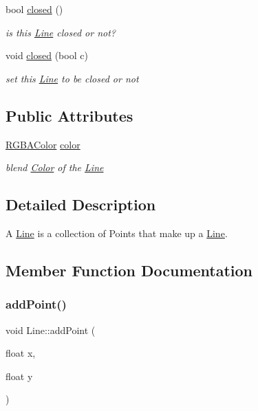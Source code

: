 \begin{DoxyCompactItemize}
bool \hyperlink{class_line_ae8d925ead08fe61d66621bfc0299482d}{closed} ()
\begin{DoxyCompactList}\small\item\em is this \hyperlink{class_line}{Line} closed or not? \end{DoxyCompactList}\item 
void \hyperlink{class_line_ac5c50dee9dd6f623a3c8ee523d504ecc}{closed} (bool c)
\begin{DoxyCompactList}\small\item\em set this \hyperlink{class_line}{Line} to be closed or not \end{DoxyCompactList}\end{DoxyCompactItemize}
\subsection*{Public Attributes}
\begin{DoxyCompactItemize}
\item 
\mbox{\label{class_line_a4d5c05eecb05f68ebf52c6b553262496}} 
\hyperlink{struct_r_g_b_a_color}{R\+G\+B\+A\+Color} \hyperlink{class_line_a4d5c05eecb05f68ebf52c6b553262496}{color}
\begin{DoxyCompactList}\small\item\em blend \hyperlink{struct_color}{Color} of the \hyperlink{class_line}{Line} \end{DoxyCompactList}\end{DoxyCompactItemize}


\subsection{Detailed Description}
A \hyperlink{class_line}{Line} is a collection of Points that make up a \hyperlink{class_line}{Line}. 

\subsection{Member Function Documentation}
\mbox{\label{class_line_ac4b0054084c2ed06583fce888921aaae}} 
\subsubsection{\texorpdfstring{add\+Point()}{addPoint()}}
{\footnotesize\ttfamily void Line\+::add\+Point (\begin{DoxyParamCaption}\item[{float}]{x,  }\item[{float}]{y }\end{DoxyParamCaption})}



